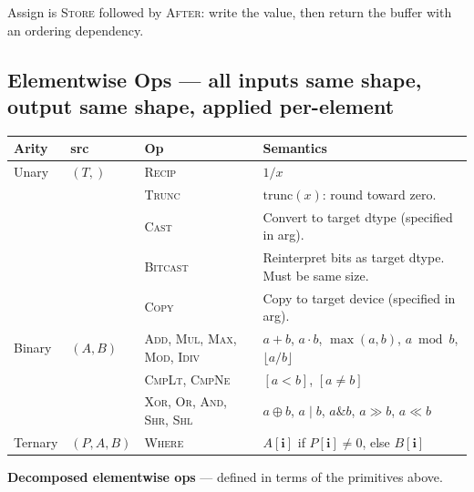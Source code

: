 \documentclass[10pt,letterpaper]{article}
\newcommand{\op}[1]{\textsc{#1}}
\begin{document}
\smallskip
Assign is \op{Store} followed by \op{After}: write the value, then return the buffer with an ordering dependency.

\subsection*{{\color{elwyellow}Elementwise Ops} \normalfont\small--- all inputs same shape, output same shape, applied per-element}

\begin{tabular}{@{}l l l l@{}}
\toprule
\textbf{Arity} & \textbf{src} & \textbf{Op} & \textbf{Semantics} \\
\midrule
Unary & $(T,)$
  & \op{Recip}
  & $1/x$ \\
& & \op{Trunc}
  & $\mathrm{trunc}(x)$: round toward zero. \\
& & \op{Cast}
  & Convert to target dtype (specified in arg). \\
& & \op{Bitcast}
  & Reinterpret bits as target dtype. Must be same size. \\
& & \op{Copy}
  & Copy to target device (specified in arg). \\[4pt]
Binary & $(A, B)$
  & \op{Add}, \op{Mul}, \op{Max}, \op{Mod}, \op{Idiv}
  & $a+b$, $a \cdot b$, $\max(a,b)$, $a \bmod b$, $\lfloor a/b \rfloor$ \\
& & \op{CmpLt}, \op{CmpNe}
  & $[a < b]$, $[a \ne b]$ \\
& & \op{Xor}, \op{Or}, \op{And}, \op{Shr}, \op{Shl}
  & $a \oplus b$, $a \mid b$, $a \mathbin{\&} b$, $a \gg b$, $a \ll b$ \\[4pt]
Ternary & $(P, A, B)$
  & \op{Where}
  & $A[\mathbf{i}]$ if $P[\mathbf{i}] \ne 0$, else $B[\mathbf{i}]$ \\

\bottomrule
\end{tabular}

\medskip
\textbf{Decomposed elementwise ops} --- defined in terms of the primitives above.
\end{document}
